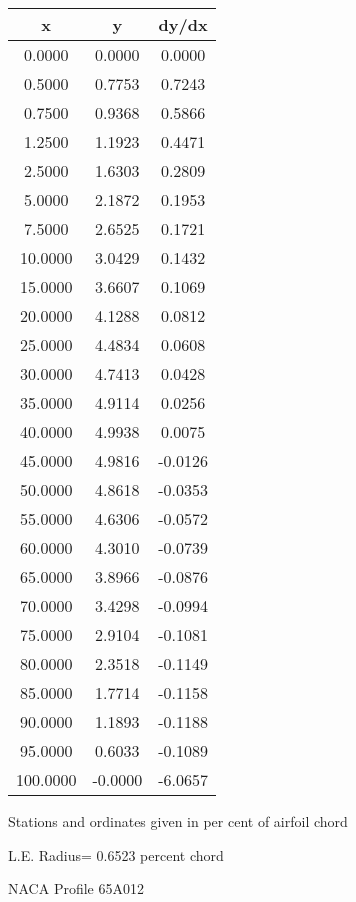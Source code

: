\documentclass[11pt]{book}
\begin{document}
 \vspace{8mm}
 \begin{tabular}{|c|c|c|} \hline 
  x  &  y  &  dy/dx \\
 \hline
0.0000 & 0.0000 & 0.0000 \\
0.5000 & 0.7753 & 0.7243 \\
0.7500 & 0.9368 & 0.5866 \\
1.2500 & 1.1923 & 0.4471 \\
2.5000 & 1.6303 & 0.2809 \\
5.0000 & 2.1872 & 0.1953 \\
7.5000 & 2.6525 & 0.1721 \\
10.0000 & 3.0429 & 0.1432 \\
15.0000 & 3.6607 & 0.1069 \\
20.0000 & 4.1288 & 0.0812 \\
25.0000 & 4.4834 & 0.0608 \\
30.0000 & 4.7413 & 0.0428 \\
35.0000 & 4.9114 & 0.0256 \\
40.0000 & 4.9938 & 0.0075 \\
45.0000 & 4.9816 & -0.0126 \\
50.0000 & 4.8618 & -0.0353 \\
55.0000 & 4.6306 & -0.0572 \\
60.0000 & 4.3010 & -0.0739 \\
65.0000 & 3.8966 & -0.0876 \\
70.0000 & 3.4298 & -0.0994 \\
75.0000 & 2.9104 & -0.1081 \\
80.0000 & 2.3518 & -0.1149 \\
85.0000 & 1.7714 & -0.1158 \\
90.0000 & 1.1893 & -0.1188 \\
95.0000 & 0.6033 & -0.1089 \\
100.0000 & -0.0000 & -6.0657 \\
 \hline
 \end{tabular}
 \vspace{8mm}


Stations and ordinates given in per cent of airfoil chord 


L.E. Radius=  0.6523 percent chord
 \newpage
  \label{p65A012}
 \begin{Large}
 NACA Profile 65A012
 \end{Large}
  
\end{document}

